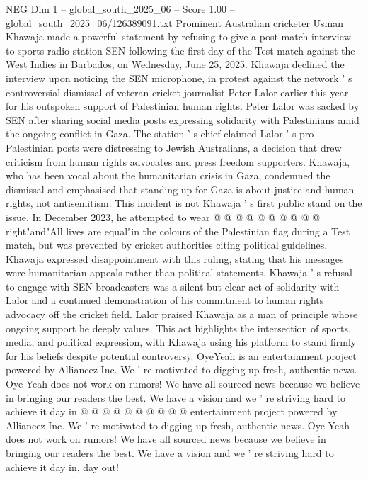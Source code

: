 \begin{textsample}{NEG Dim 1 – global\_south\_2025\_06 – Score 1.00 – global\_south\_2025\_06/126389091.txt}  \label{ex:f1_neg_315}
Prominent Australian cricketer Usman Khawaja made a powerful statement by refusing to give a post-match interview to sports radio station SEN following the first day of the Test match against the West Indies in Barbados, on Wednesday, June 25, 2025.
Khawaja declined the interview upon noticing the SEN microphone, in protest against the network ' s controversial dismissal of veteran cricket journalist Peter Lalor earlier this year for his outspoken support of Palestinian human rights.
Peter Lalor was sacked by SEN after sharing social media posts expressing solidarity with Palestinians amid the ongoing conflict in Gaza.
The station ' s chief claimed Lalor ' s pro-Palestinian posts were distressing to Jewish Australians, a decision that drew criticism from human rights advocates and press freedom supporters.
Khawaja, who has been vocal about the humanitarian crisis in Gaza, condemned the dismissal and emphasised that standing up for Gaza is about justice and human rights, not antisemitism.
This incident is not Khawaja ' s first public stand on the issue.
In December 2023, he attempted to wear @ @ @ @ @ @ @ @ @ @ right"and"All lives are equal"in the colours of the Palestinian flag during a Test match, but was prevented by cricket authorities citing political guidelines.
Khawaja expressed disappointment with this ruling, stating that his messages were humanitarian appeals rather than political statements.
Khawaja ' s refusal to engage with SEN broadcasters was a silent but clear act of solidarity with Lalor and a continued demonstration of his commitment to human rights advocacy off the cricket field.
Lalor praised Khawaja as a man of principle whose ongoing support he deeply values.
This act highlights the intersection of sports, media, and political expression, with Khawaja using his platform to stand firmly for his beliefs despite potential controversy.
OyeYeah is an entertainment project powered by Alliancez Inc.
We ' re motivated to digging up fresh, authentic news.
Oye Yeah does not work on rumors!
We have all sourced news because we believe in bringing our readers the best.
We have a vision and we ' re striving hard to achieve it day in @ @ @ @ @ @ @ @ @ @ entertainment project powered by Alliancez Inc.
We ' re motivated to digging up fresh, authentic news.
Oye Yeah does not work on rumors!
We have all sourced news because we believe in bringing our readers the best.
We have a vision and we ' re striving hard to achieve it day in, day out!

\end{textsample}
